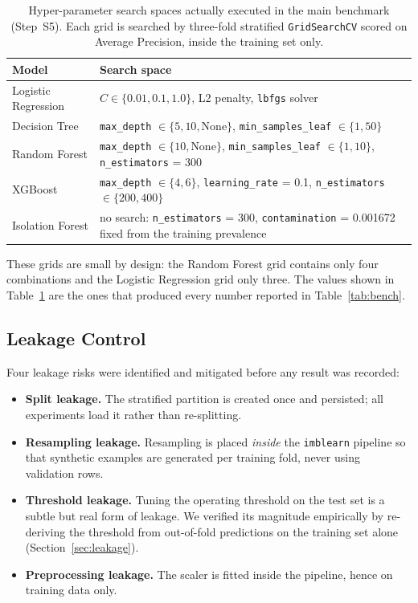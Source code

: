 \begin{table}[H]
\centering
\caption{Hyper-parameter search spaces actually executed in the main benchmark
(Step~S5). Each grid is searched by three-fold stratified
\texttt{GridSearchCV} scored on Average Precision, inside the training set
only.}
\label{tab:models}
\begin{tabular}{p{3.2cm}p{8.5cm}}
\toprule
\textbf{Model} & \textbf{Search space} \\
\midrule
Logistic Regression & $C \in \{0.01, 0.1, 1.0\}$, L2 penalty, \texttt{lbfgs} solver \\
Decision Tree & \texttt{max\_depth} $\in \{5,10,\text{None}\}$, \texttt{min\_samples\_leaf} $\in \{1,50\}$ \\
Random Forest & \texttt{max\_depth} $\in \{10,\text{None}\}$, \texttt{min\_samples\_leaf} $\in \{1,10\}$, \texttt{n\_estimators} = 300 \\
XGBoost & \texttt{max\_depth} $\in \{4,6\}$, \texttt{learning\_rate} = 0.1, \texttt{n\_estimators} $\in \{200,400\}$ \\
Isolation Forest & no search: \texttt{n\_estimators} = 300, \texttt{contamination} = 0.001672 fixed from the training prevalence \\
\bottomrule
\end{tabular}
\end{table}

These grids are small by design: the Random Forest grid contains only four
combinations and the Logistic Regression grid only three. The values shown in
Table~\ref{tab:models} are the ones that produced every number reported in
Table~\ref{tab:bench}.

\subsection{Leakage Control}

Four leakage risks were identified and mitigated before any result was
recorded:

\begin{itemize}
    \item \textbf{Split leakage.} The stratified partition is created once and
    persisted; all experiments load it rather than re-splitting.
    \item \textbf{Resampling leakage.} Resampling is placed \emph{inside} the
    \texttt{imblearn} pipeline so that synthetic examples are generated per
    training fold, never using validation rows.
    \item \textbf{Threshold leakage.} Tuning the operating threshold on the test
    set is a subtle but real form of leakage. We verified its magnitude
    empirically by re-deriving the threshold from out-of-fold predictions on the
    training set alone (Section~\ref{sec:leakage}).
    \item \textbf{Preprocessing leakage.} The scaler is fitted inside the
    pipeline, hence on training data only.
\end{itemize}

